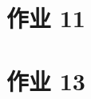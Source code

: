 \documentclass[main.tex]{subfiles}
\begin{document}
\section{作业 11}

\section{作业 13}

\end{document}
